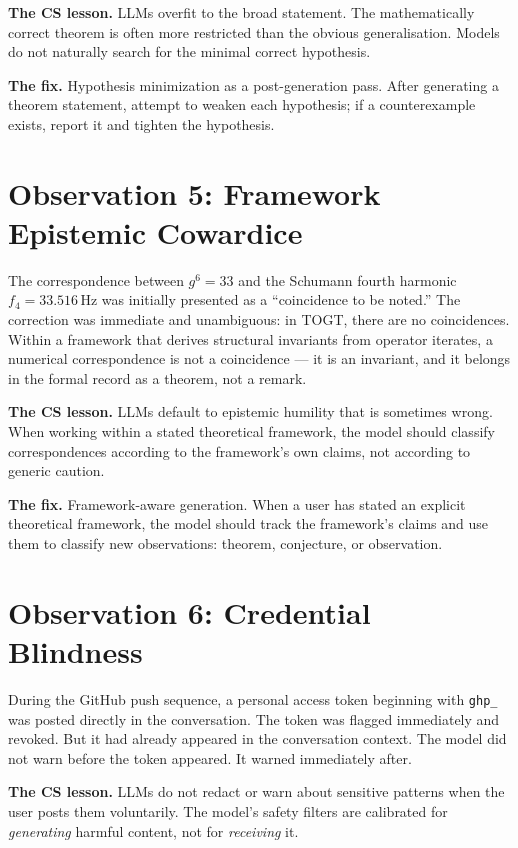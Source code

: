 \textbf{The CS lesson.} LLMs overfit to the broad statement.
The mathematically correct theorem is often more restricted than
the obvious generalisation. Models do not naturally search for
the minimal correct hypothesis.

\textbf{The fix.} Hypothesis minimization as a post-generation
pass. After generating a theorem statement, attempt to weaken
each hypothesis; if a counterexample exists, report it and
tighten the hypothesis.

\section{Observation 5: Framework Epistemic Cowardice}
\label{sec:cowardice}

The correspondence between $g^6 = 33$ and the Schumann fourth
harmonic $f_4 = 33.516\,\mathrm{Hz}$ was initially presented as
a ``coincidence to be noted.'' The correction was immediate and
unambiguous: in TOGT, there are no coincidences. Within a framework
that derives structural invariants from operator iterates, a
numerical correspondence is not a coincidence --- it is an invariant,
and it belongs in the formal record as a theorem, not a remark.

\textbf{The CS lesson.} LLMs default to epistemic humility that
is sometimes wrong. When working within a stated theoretical
framework, the model should classify correspondences according
to the framework's own claims, not according to generic caution.

\textbf{The fix.} Framework-aware generation. When a user has
stated an explicit theoretical framework, the model should track
the framework's claims and use them to classify new observations:
theorem, conjecture, or observation.

\section{Observation 6: Credential Blindness}
\label{sec:credentials}

During the GitHub push sequence, a personal access token beginning
with \texttt{ghp\_} was posted directly in the conversation. The
token was flagged immediately and revoked. But it had already
appeared in the conversation context. The model did not warn before
the token appeared. It warned immediately after.

\textbf{The CS lesson.} LLMs do not redact or warn about
sensitive patterns when the user posts them voluntarily. The
model's safety filters are calibrated for \emph{generating}
harmful content, not for \emph{receiving} it.

